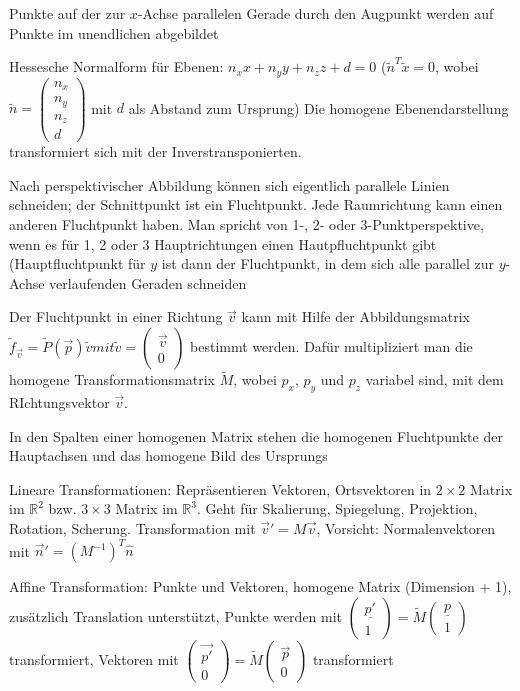 \documentclass[12pt,landscape]{article}
\begin{document}
\begin{multicols}{3}
\begin{compactitem}
\item Punkte auf der zur $x$-Achse parallelen Gerade durch den Augpunkt werden auf Punkte im unendlichen abgebildet
\item Hessesche Normalform für Ebenen: $n_{x}x + n_{y}y + n_{z}z + d = 0$ ($\tilde{n}^{T}\tilde{x} = 0$, wobei $\tilde{n} = \begin{pmatrix}n_x \\ n_y \\ n_z \\ d\end{pmatrix}$ mit $d$ als Abstand zum Ursprung) Die homogene Ebenendarstellung transformiert sich mit der Inverstransponierten.
\item Nach perspektivischer Abbildung können sich eigentlich parallele Linien schneiden; der Schnittpunkt ist ein Fluchtpunkt. Jede Raumrichtung kann einen anderen Fluchtpunkt haben. Man spricht von 1-, 2- oder 3-Punktperspektive, wenn es für 1, 2 oder 3 Hauptrichtungen einen Hautpfluchtpunkt gibt (Hauptfluchtpunkt für $y$ ist dann der Fluchtpunkt, in dem sich alle parallel zur $y$-Achse verlaufenden Geraden schneiden
\item Der Fluchtpunkt in einer Richtung $\vec{v}$ kann mit Hilfe der Abbildungsmatrix $\tilde{f}_{\vec{v}} = \tilde{P}(\vec{p})\tilde{v} mit \tilde{v} = \begin{pmatrix}
\vec{v} \\ 0\end{pmatrix}$ bestimmt werden. Dafür multipliziert man die homogene Transformationsmatrix $\tilde{M}$, wobei $p_x$, $p_y$ und $p_z$ variabel sind, mit dem RIchtungsvektor $\vec{v}$. 
\item In den Spalten einer homogenen Matrix stehen die homogenen Fluchtpunkte der Hauptachsen und das homogene Bild des Ursprungs
\item Lineare Transformationen: Repräsentieren Vektoren, Ortsvektoren in $2 \times 2$ Matrix im $\mathbb{R}^2$ bzw. $3 \times 3$ Matrix im $\mathbb{R}^3$. Geht für Skalierung, Spiegelung, Projektion, Rotation, Scherung. Transformation mit $\vec{v}' = M\vec{v}$, Vorsicht: Normalenvektoren mit $\vec{n}' = (M^{-1})^{T}\hat{n}$
\item Affine Transformation: Punkte und Vektoren, homogene Matrix (Dimension + 1), zusätzlich Translation unterstützt, Punkte werden mit $\begin{pmatrix}\underline{p'} \\ 1\end{pmatrix} = \tilde{M} \begin{pmatrix}\underline{p} \\ 1\end{pmatrix}$ transformiert, Vektoren mit $\begin{pmatrix}\vec{p'} \\ 0\end{pmatrix} = \tilde{M} \begin{pmatrix}\vec{p} \\ 0\end{pmatrix}$ transformiert

\end{compactitem}
\end{multicols}
\end{document}

